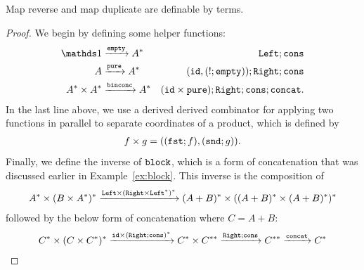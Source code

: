 \begin{lemma}\label{lem:terms-define-map-reverse-duplicate}
   Map reverse and map duplicate are definable by terms.
\end{lemma}
\begin{proof}
    We begin by defining some helper functions:
            \begin{align*}
        \onetype & \xrightarrow \emptyterm A^*  & \leftterm; \consterm \\ 
        A & \xrightarrow \pureterm A^* & (\idterm, (!;\emptyterm));\rightterm;\consterm\\
        A^* \times A^* & \xrightarrow \binconcterm A^* & (\idterm \times \pureterm); \rightterm; \consterm; \concatterm .
        \end{align*}
    In the last line above,  we  use a derived derived combinator for applying two functions in parallel to separate coordinates of a product, which is defined by
    \begin{align*}
    f \times g = ((\mathtt{fst};f),(\mathtt{snd};g)).
    \end{align*}
    Finally, we define the inverse of $\mathtt{block}$, which is a form of concatenation that was discussed earlier in Example~\ref{ex:block}. This inverse is the composition of 
    \begin{align*}
    A^* \times (B \times A^*)^* \xrightarrow{\mathtt{Left} \times (\mathtt{Right} \times \mathtt{Left}^*)^*} (A+B)^* \times ((A+B)^* \times (A+B)^*)^*
    \end{align*}
    followed by the below form of concatenation where $C = A+B$:
    \begin{align*}
    C^* \times (C \times C^*)^* \xrightarrow{ \mathtt{id} \times (\mathtt{Right}; \mathtt{cons})^*} C^* \times C^{**} \xrightarrow{\mathtt{Right};\mathtt{cons}} C^{**} \xrightarrow {\mathtt{concat}} C^*
    \end{align*}


\end{proof}
